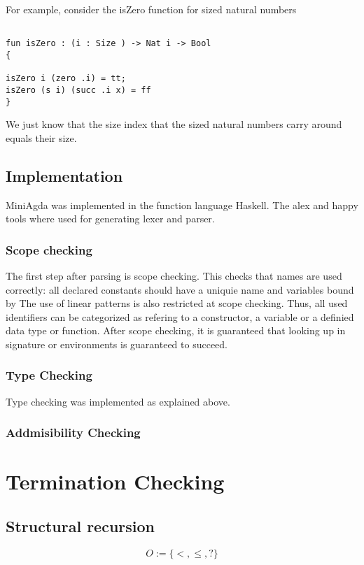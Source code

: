 For example, consider the isZero function for sized natural numbers

\begin{verbatim}

fun isZero : (i : Size ) -> Nat i -> Bool
{

isZero i (zero .i) = tt;
isZero (s i) (succ .i x) = ff
}
\end{verbatim}
We just know that the size index that the sized natural numbers carry around equals their size.


\section{Implementation}

MiniAgda was implemented in the function language Haskell.
The alex and happy tools where used for generating lexer and parser.

\subsection{Scope checking}
The first step after parsing is scope checking. This checks that names are used correctly:
all declared constants should have a uniquie name and variables bound by 
The use of linear patterns is also restricted at scope checking.
Thus, all used identifiers can be categorized as refering to a constructor, a variable or a definied data type or
function.
After scope checking, it is guaranteed that looking up in signature or environments is guaranteed to succeed.
\subsection{Type Checking}
Type checking was implemented as explained above.
\subsection{Addmisibility Checking}

\chapter{Termination Checking}

\section{Structural recursion}

\begin{definition}[Order]
\[ O := \{ < , \leq , ? \} \]
\end{definition}

